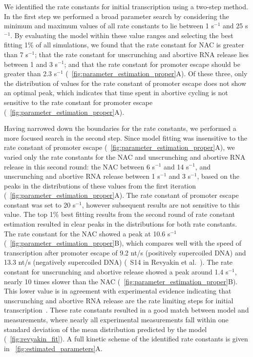 %

We identified the rate constants for initial transcription using a two-step
method. In the first step we performed a broad parameter search by considering
the minimum and maximum values of all rate constants to lie between 1 s$^{-1}$
and 25 s$^{-1}$. By evaluating the model within these value ranges and
selecting the best fitting 1\% of all simulations, we found that the rate
constant for NAC is greater than 7 s$^{-1}$; that the rate constant for
unscrunching and abortive RNA release lies between 1 and 3 s$^{-1}$; and that
the rate constant for promoter escape should be greater than 2.3 s$^{-1}$
(\FIG~\ref{fig:parameter_estimation_proper}A). Of these three, only the
distribution of values for the rate constant of promoter escape does not show
an optimal peak, which indicates that time spent in abortive cycling is not
sensitive to the rate constant for promoter escape
(\FIG~\ref{fig:parameter_estimation_proper}A).

Having narrowed down the boundaries for the rate constants, we performed a
more focused search in the second step. Since model fitting was insensitive to
the rate constant of promoter escape
(\FIG~\ref{fig:parameter_estimation_proper}A), we varied only the rate
constants for the NAC and unscrunching and abortive RNA release in this second
round: the NAC between 6 s$^{-1}$ and 14 s$^{-1}$, and unscrunching and
abortive RNA release between 1 s$^{-1}$ and 3 s$^{-1}$, based on the peaks in
the distributions of these values from the first iteration
(\FIG~\ref{fig:parameter_estimation_proper}A). The rate constant of promoter
escape constant was set to 20 s$^{-1}$, however subsequent results are not
sensitive to this value. The top 1\% best fitting results from the second
round of rate constant estimation resulted in clear peaks in the distributions
for both rate constants. The rate constant for the NAC showed a peak at 10.6
s$^{-1}$ (\FIG~\ref{fig:parameter_estimation_proper}B), which compares well
with the speed of transcription after promoter escape of 9.2 nt/s (positively
supercoiled DNA) and 13.3 nt/s (negatively supercoiled DNA) (\FIG~S14 in
Revyakin et al.\ \cite{revyakin_abortive_2006}). The rate constant for
unscrunching and abortive release showed a peak around 1.4 s$^{-1}$, nearly 10
times slower than the NAC (\FIG~\ref{fig:parameter_estimation_proper}B). This
lower value is in agreement with experimental evidence indicating that
unscrunching and abortive RNA release are the rate limiting steps for initial
transcription~\cite{revyakin_abortive_2006, margeat_direct_2006}. These rate
constants resulted in a good match between model and measurements, where
nearly all experimental measurements fall within one standard deviation of the
mean distribution predicted by the model (\FIG~\ref{fig:revyakin_fit}). A full
kinetic scheme of the identified rate constants is given in
\FIG~\ref{fig:estimated_parameters}A.

